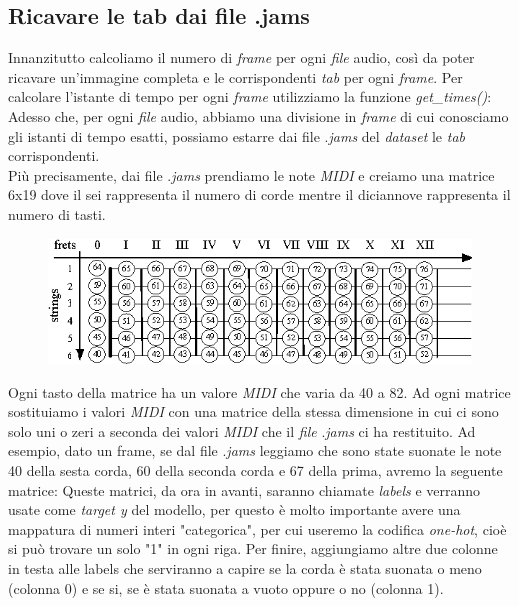 \subsection{Ricavare le tab dai file .jams}
Innanzitutto calcoliamo il numero di \textit{frame} per ogni \textit{file} audio, così da poter ricavare un'immagine completa e le corrispondenti \textit{tab} per ogni \textit{frame}. Per calcolare l'istante di tempo per ogni \textit{frame} utilizziamo la funzione \textit{get\_times()}:
\vspace*{2ex}
\vspace*{2ex}
Adesso che, per ogni \textit{file} audio, abbiamo una divisione in \textit{frame} di cui conosciamo gli istanti di tempo esatti, possiamo estarre dai file .\textit{jams} del \textit{dataset} le \textit{tab} corrispondenti.\\ Più precisamente, dai file .\textit{jams} prendiamo le note \textit{MIDI} e creiamo una matrice 6x19 dove il sei rappresenta il numero di corde mentre il diciannove rappresenta il numero di tasti.
\begin{figure}[H]
	\centering
	\includegraphics[scale=0.65]{./images/img11.png}
\end{figure}
Ogni tasto della matrice ha un valore \textit{MIDI} che varia da 40 a 82.
\vspace*{2ex}
\vspace*{2ex}
Ad ogni matrice sostituiamo i valori \textit{MIDI} con una matrice della stessa dimensione in cui ci sono solo uni o zeri a seconda dei valori \textit{MIDI} che il \textit{file} .\textit{jams} ci ha restituito. Ad esempio, dato un frame, se dal file .\textit{jams} leggiamo che sono state suonate le note 40 della sesta corda, 60 della seconda corda e 67 della prima, avremo la seguente matrice:
\vspace*{2ex}
\vspace*{2ex}
Queste matrici, da ora in avanti, saranno chiamate \textit{labels} e verranno usate come \textit{target y} del modello, per questo è molto importante avere una mappatura di numeri interi "categorica", per cui useremo la codifica \textit{one-hot}, cioè si può trovare un solo "1" in ogni riga. Per finire, aggiungiamo altre due colonne in testa alle labels che serviranno a capire se la corda è stata suonata o meno (colonna 0) e se si, se è stata suonata a vuoto oppure o no (colonna 1).\\

